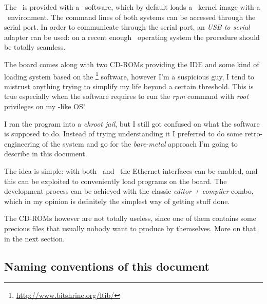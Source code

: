 The \MyBoard\ is provided with a \uBoot\ software, which by default loads
a \Linux\ kernel image with a \BusyBox\ environment. The command lines of
both systems can be accessed through the serial port. In order to
communicate through the serial port, an \emph{USB to serial} adapter can
be used: on a recent enough \GNULinux\ operating system the procedure
should be totally seamless.

The board comes along with two CD-ROMs providing the
 IDE and some kind of loading system based on the
\LTIB\footnote{ \url{http://www.bitshrine.org/ltib/} } software, however
I'm a suspicious guy, I tend to mistrust anything trying to simplify my
life beyond a certain threshold.  This is true especially when the
software requires to run the \emph{rpm} command with \emph{root}
privileges on my \Debian-like OS!

I ran the program into a  \emph{chroot jail}, but I
still got confused on what the software is supposed to do. Instead of
trying understanding it I preferred to do some retro-engineering of the
system and go for the \emph{bare-metal} approach I'm going to describe in
this document.

The idea is simple: with both \uBoot\ and \Linux\ the Ethernet interfaces
can be enabled, and this can be exploited to conveniently load programs on
the board. The development process can be achieved with the classic
\emph{editor + compiler} combo, which in my opinion is definitely the
simplest way of getting stuff done.

The CD-ROMs however are not totally useless, since one of them contains
some precious files that usually nobody want to produce by themselves.
More on that in the next section.

\subsection{ Naming conventions of this document }

